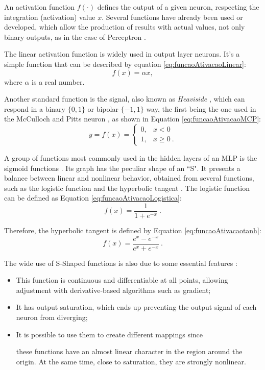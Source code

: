 An activation function $f(\cdot)$ defines the output of a given neuron, respecting the integration (activation) value $x$. Several functions have already been used or developed, which allow the production of results with actual values, not only binary outputs, as in the case of Perceptron \cite{haykin}.

The linear activation function is widely used in output layer neurons. It's a simple function that can be described by equation \ref{eq:funcaoAtivacaoLinear}:
\begin{equation}
	\label{eq:funcaoAtivacaoLinear}
	f(x) = \alpha x,
\end{equation}
where $\alpha$ is a real number.

Another standard function is the signal, also known as \textit{Heaviside} \cite{haykin}, which can respond in a binary $\{0, 1\}$ or bipolar $\{-1, 1\}$ way, the first being the one used in the McCulloch and Pitts neuron \cite{McCulloch1990}, as shown in Equation \ref{eq:funcaoAtivacaoMCP}:
\begin{equation}
	\label{eq:funcaoAtivacaoMCP}
	y = f(x) = \left\{\begin{matrix}
		0, & x < 0    \\
		1, & x \geq 0 \: .
	\end{matrix}\right.
\end{equation}

A group of functions most commonly used in the hidden layers of an MLP is the sigmoid functions \cite{haykin, Castro2006FundamentalsON}. Its graph has the peculiar shape of an ``S". It presents a balance between linear and nonlinear behavior, obtained from several functions, such as the logistic function and the hyperbolic tangent \cite{Jeffrey2008}. The logistic function can be defined as Equation \ref{eq:funcaoAtivacaoLogistica}:
\begin{equation}
	\label{eq:funcaoAtivacaoLogistica}
	f(x) = \frac{1}{1 + e^{-x}}\:.
\end{equation}

Therefore, the hyperbolic tangent is defined by Equation \ref{eq:funcaoAtivacaotanh}:
\begin{equation}
\label{eq:funcaoAtivacaotanh}
	f(x) = \frac{e^x - e^{-x}}{e^x + e^{-x}}\:.
\end{equation}

The wide use of S-Shaped functions is also due to 
some 
essential features \cite{Menon1996}:

\begin{itemize}
    \item %
    This function is continuous and differentiable at all points, allowing adjustment with derivative-based algorithms such as gradient;
    \item It has 
    output saturation, which ends up preventing the output signal of each neuron from diverging;
    \item It is possible to use them to create different mappings since 
    
    these functions 
    have an almost linear character in the region around the origin. At the same time, close to saturation, they are strongly nonlinear.
\end{itemize}

